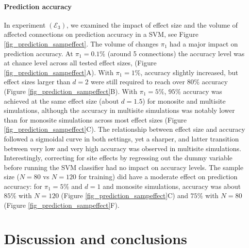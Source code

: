\documentclass[authoryear]{elsarticle}
\begin{document}
\paragraph{Prediction accuracy}
In experiment $(\mathcal{E}_3)$, we examined the impact of effect size and the volume of affected connections on prediction accuracy in a SVM, see Figure \ref{fig_prediction_sampeffect}. The volume of changes $\pi_1$ had a major impact on prediction accuracy. At $\pi_1=0.1\%$ (around 5 connections) the accuracy level was at chance level across all tested effect sizes, (Figure \ref{fig_prediction_sampeffect}A). With $\pi_1=1\%$, accuracy slightly increased, but effect sizes larger than $d=2$ were still required to reach over $80\%$ accuracy (Figure \ref{fig_prediction_sampeffect}B). With $\pi_1=5\%$, $95\%$ accuracy was achieved at the same effect size (about $d=1.5$) for monosite and multisite simulations, although the accuracy in multisite simulations was notably lower than for monosite simulations across most effect sizes (Figure \ref{fig_prediction_sampeffect}C). The relationship between effect size and accuracy followed a sigmoidal curve in both settings, yet a sharper, and latter transition between very low and very high accuracy was observed in multisite simulations. Interestingly, correcting for site effects by regressing out the dummy variable before running the SVM classifier had no impact on accuracy levels. The sample size ($N=80$ vs $N=120$ for training) did have a moderate effect on prediction accuracy: for $\pi_1=5\%$ and $d=1$ and monosite simulations, accuracy was about $85\%$ with $N=120$ (Figure \ref{fig_prediction_sampeffect}C) and $75\%$ with $N=80$ (Figure \ref{fig_prediction_sampeffect}F).


\section{Discussion and conclusions}

\end{document}
